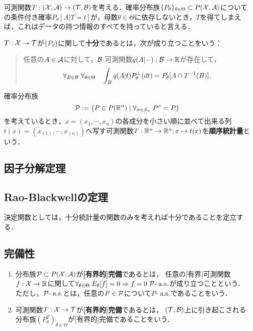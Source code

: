\documentclass[uplatex,dvipdfmx]{jsreport}
\begin{document}
\begin{notation}
    可測関数$T:(\X,\A)\to(\cT,\B)$を考える．確率分布族$\{P_\theta\}_{\theta\in\Theta}\subset P(\X,\A)$についての条件付き確率$P_\theta[A|T=t]$が，母数$\theta\in\Theta$に依存しないとき，$T$を得てしまえば，これはデータの持つ情報のすべてを持っていると言える．
\end{notation}

\begin{definition}
    $T:\X\to\cT$が$\{P_\theta\}$に関して\textbf{十分}であるとは，次が成り立つことをいう：
    \begin{quote}
        任意の$A\in\A$に対して，$\B$-可測関数$q(A|-):\B\to\R$が存在して，
        \[\forall_{B\in\B}\;\forall_{\theta\in\Theta}\quad\int_Bq(A|t)P_\theta^\perp(dt)=P_\theta[A\cap T^{-1}(B)].\]
    \end{quote}
\end{definition}

\begin{example}
    確率分布族
    \[\P:=\Brace{P\in P(\R^n)\mid\forall_{\sigma\in S_n}\;P^\sigma=P}\]
    を考えているとき，$x=(x_1,\cdots,x_n)$の各成分を小さい順に並べて出来る列$t(x)=(x_{(1)},\cdots,x_{(n)})$へ写す可測関数$T:\R^n\to\R^n;x\mapsto t(x)$を\textbf{順序統計量}という．
\end{example}

\subsection{因子分解定理}

\subsection{Rao-Blackwellの定理}

\begin{tcolorbox}[colframe=ForestGreen, colback=ForestGreen!10!white,breakable,colbacktitle=ForestGreen!40!white,coltitle=black,fonttitle=\bfseries\sffamily,
title=]
    決定関数としては，十分統計量の関数のみを考えれば十分であることを定立する．
\end{tcolorbox}

\subsection{完備性}

\begin{definition}\mbox{}
    \begin{enumerate}
        \item 分布族$\P\subset P(\X,\A)$が\textbf{[有界的]完備}であるとは，
        任意の[有界]可測関数$f:\X\to\R$に関して$\forall_{\theta\in\Theta}\;E_\theta[f]=0\Rightarrow f=0\;\P\text{-}\as$が成り立つことという．
        ただし，$\P\text{-}\as$とは，任意の$P\in\P$について$P$-$\as$であることをいう．
        \item 可測関数$T:\X\to\cT$が\textbf{[有界的]完備}であるとは，
        $(\cT,\B)$上に引き起こされる分布族$(P^T_\theta)_{\theta\in\Theta}$が[有界的]完備であることをいう．
    \end{enumerate}
\end{definition}
\end{document}
